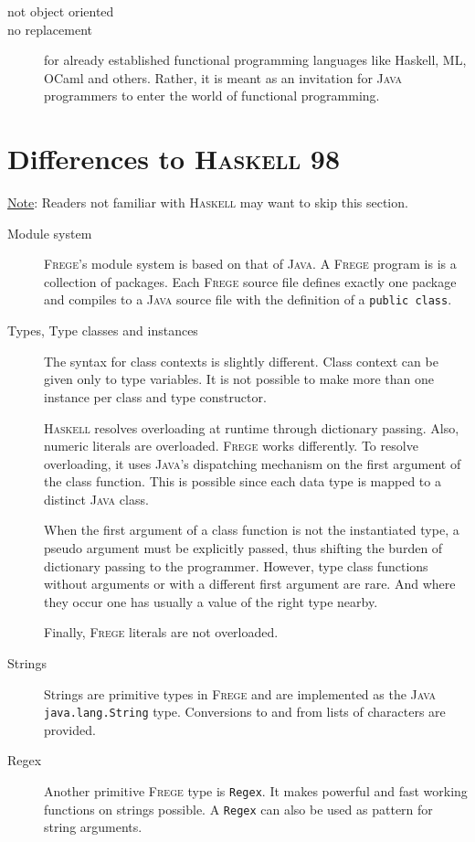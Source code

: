 \documentclass[a4paper,twocolumn,landscape]{report}
\newcommand{\boxquote}[3]{
\begin{center}
\colorbox{#1}%
{\parbox{0.45\textwidth}{
\sf
\underline{#2}:
#3
}}
\end{center}}
\newcommand{\note}[1]{\boxquote{grau}{Note}{#1}}
\newcommand{\haskell}[0]{\textsc{Haskell}}
\newcommand{\frege}[0]{\textsc{Frege}}
\newcommand{\java}{\textsc{Java}}
\begin{document}
\begin{description}

\item[not object oriented]

\item[no replacement]

for already established functional programming languages like Haskell,
ML, OCaml and others.
Rather, it is meant as an invitation for \java{} programmers to enter
the world of functional programming.

\end{description}

\section{Differences to \haskell{} 98}

\note{Readers not familiar with \haskell{} may want to skip this
section.}

\begin{description}
\item[Module system]
\frege{}'s module system is based on that of \java{}. A \frege{}
program is is a collection of packages. Each \frege{}
source file defines exactly one package
and compiles to a \java{} source file with the definition of a
\texttt{public class}.


\item[Types, Type classes and instances]
The syntax for class contexts is slightly different. 
Class context can be given only to type variables. 
It is not possible to make more than one instance per class and type constructor.

\haskell{} resolves overloading at runtime through dictionary passing.
Also, numeric literals are overloaded.
\frege{} works differently.  To resolve overloading, it uses \java{}'s
dispatching mechanism on the first argument of the class function. This
is possible since each data type is mapped
to a distinct \java{} class.
\par When the first argument of a class function
is not
the instantiated type, a pseudo argument must be explicitly passed,
thus shifting the burden of dictionary passing to the programmer.
However, type class functions without arguments or with a different
first argument are rare. And where they occur one has usually a value of
the right type nearby.

Finally, \frege{} literals are not overloaded.

\item[Strings]
Strings are primitive types in \frege{} and are implemented
as the \java{} \texttt{java.lang.String} type.
Conversions to and
from lists of characters are provided.

\item[Regex]
\par Another primitive \frege{} type is \texttt{Regex}. It makes
powerful
and fast working functions on strings possible. A \texttt{Regex} can
also
be used as pattern for string arguments.

\end{description}
\end{document}
